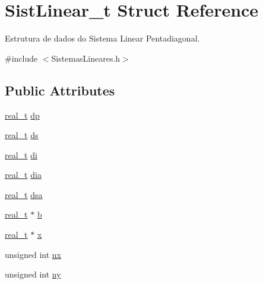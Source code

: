 \hypertarget{structSistLinear__t}{}\section{Sist\+Linear\+\_\+t Struct Reference}
\label{structSistLinear__t}


Estrutura de dados do Sistema Linear Pentadiagonal.  




{\ttfamily \#include $<$Sistemas\+Lineares.\+h$>$}

\subsection*{Public Attributes}
\begin{DoxyCompactItemize}
\item 
\hyperlink{SistemasLineares_8h_a0d00e2b3dfadee81331bbb39068570c4}{real\+\_\+t} \hyperlink{structSistLinear__t_ac7f13772865711ff339023fc6ca5ab96}{dp}
\item 
\hyperlink{SistemasLineares_8h_a0d00e2b3dfadee81331bbb39068570c4}{real\+\_\+t} \hyperlink{structSistLinear__t_a2ecc07569471ddd006631f7514960bbb}{ds}
\item 
\hyperlink{SistemasLineares_8h_a0d00e2b3dfadee81331bbb39068570c4}{real\+\_\+t} \hyperlink{structSistLinear__t_a697bd2cd155a3d860f6df76738a5149c}{di}
\item 
\hyperlink{SistemasLineares_8h_a0d00e2b3dfadee81331bbb39068570c4}{real\+\_\+t} \hyperlink{structSistLinear__t_a304278b13b51650f8d6e6482311918c8}{dia}
\item 
\hyperlink{SistemasLineares_8h_a0d00e2b3dfadee81331bbb39068570c4}{real\+\_\+t} \hyperlink{structSistLinear__t_aefdf2d67bee5c6471bae21bb7ced88a6}{dsa}
\item 
\hyperlink{SistemasLineares_8h_a0d00e2b3dfadee81331bbb39068570c4}{real\+\_\+t} $\ast$ \hyperlink{structSistLinear__t_a5f554632eec68e5e0dbea0058c9657ac}{b}
\item 
\hyperlink{SistemasLineares_8h_a0d00e2b3dfadee81331bbb39068570c4}{real\+\_\+t} $\ast$ \hyperlink{structSistLinear__t_a106437fbdef1dee46d7b1c34509e0da1}{x}
\item 
unsigned int \hyperlink{structSistLinear__t_a0f02ce66276316fd835180cf6a033001}{nx}
\item 
unsigned int \hyperlink{structSistLinear__t_a84d8f1f84f050ca4dfc93a4ceaef2b9a}{ny}
\end{DoxyCompactItemize}


